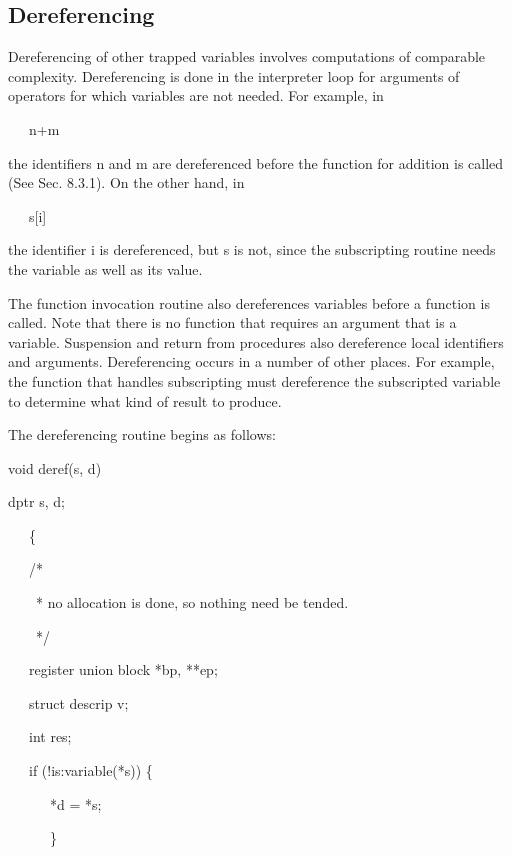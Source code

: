 \subsection{Dereferencing}

Dereferencing of other trapped variables involves computations of
comparable complexity. Dereferencing is done in the interpreter loop
for arguments of operators for which variables are not needed. For
example, in

{\ttfamily\mdseries
\ \ \ n+m}

\noindent the identifiers n and m are dereferenced before the function
for addition is called (See Sec. 8.3.1). On the other hand, in

{\ttfamily\mdseries
\ \ \ s[i]}

\noindent the identifier i is dereferenced, but s is not, since the
subscripting routine needs the variable as well as its value.

The function invocation routine also dereferences variables before a
function is called. Note that there is no function that requires an
argument that is a variable. Suspension and return from procedures
also dereference local identifiers and arguments. Dereferencing occurs
in a number of other places. For example, the function that handles
subscripting must dereference the subscripted variable to determine
what kind of result to produce.

The dereferencing routine begins as follows:

{\ttfamily\mdseries
void deref(s, d)}

{\ttfamily\mdseries
dptr s, d;}

{\ttfamily\mdseries
\ \ \ \{}

{\ttfamily\mdseries
\ \ \ /*}

{\ttfamily\mdseries
\ \ \ \ * no allocation is done, so nothing need be tended.}

{\ttfamily\mdseries
\ \ \ \ */}

{\ttfamily\mdseries
\ \ \ register union block *bp, **ep;}

{\ttfamily\mdseries
\ \ \ struct descrip v;}

{\ttfamily\mdseries
\ \ \ int res;}


\bigskip

{\ttfamily\mdseries
\ \ \ if (!is:variable(*s)) \{}

{\ttfamily\mdseries
\ \ \ \ \ \ *d = *s;}

{\ttfamily\mdseries
\ \ \ \ \ \ \}}


